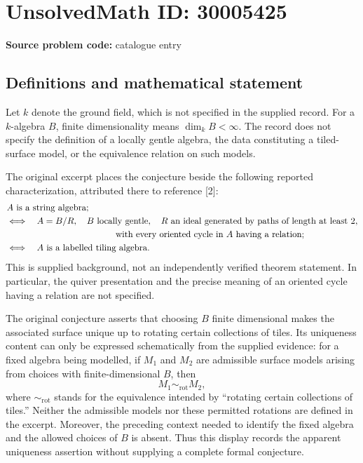 \documentclass[11pt]{article}
\begin{document}
\section*{UnsolvedMath ID: 30005425}
\textbf{Source problem code:} catalogue entry
\subsection{Definitions and mathematical statement}
Let \(k\) denote the ground field, which is not specified in the supplied record. For a \(k\)-algebra \(B\), finite dimensionality means \(\dim_k B<\infty\). The record does not specify the definition of a locally gentle algebra, the data constituting a tiled-surface model, or the equivalence relation on such models.

The original excerpt places the conjecture beside the following reported characterization, attributed there to reference [2]:
\[
\begin{aligned}
&A\text{ is a string algebra};\\
&\Longleftrightarrow\quad A=B/R,\quad B\text{ locally gentle},\quad
R\text{ an ideal generated by paths of length at least }2,\\
&\hspace{43mm}\text{with every oriented cycle in }A\text{ having a relation};\\
&\Longleftrightarrow\quad A\text{ is a labelled tiling algebra}.
\end{aligned}
\]
This is supplied background, not an independently verified theorem statement. In particular, the quiver presentation and the precise meaning of an oriented cycle having a relation are not specified.

The original conjecture asserts that choosing \(B\) finite dimensional makes the associated surface unique up to rotating certain collections of tiles. Its uniqueness content can only be expressed schematically from the supplied evidence: for a fixed algebra being modelled, if \(M_1\) and \(M_2\) are admissible surface models arising from choices with finite-dimensional \(B\), then
\[
M_1\sim_{\mathrm{rot}}M_2,
\]
where \(\sim_{\mathrm{rot}}\) stands for the equivalence intended by ``rotating certain collections of tiles.'' Neither the admissible models nor these permitted rotations are defined in the excerpt. Moreover, the preceding context needed to identify the fixed algebra and the allowed choices of \(B\) is absent. Thus this display records the apparent uniqueness assertion without supplying a complete formal conjecture.
\end{document}
